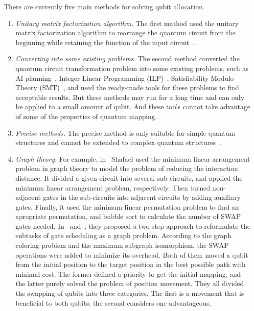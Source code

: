 \documentclass[runningheads]{llncs}
\begin{document}
There are currently five main methods for solving qubit allocation.
\begin{enumerate}
	\item \emph{Unitary matrix factorization algorithm.} 
	The first mathod used the unitary matrix factorization algorithm to rearrange 
the quantum circuit from the beginning while retaining the function of the input 
circuit~\cite{2019CNOT,2019Quantum}.
	\item \emph{Converting into some existing problems.}  
	The second method converted the quantum circuit transformation problem into 
	some existing problems, such as AI planning~\cite{2017Temporal,2018Integer}, 
	Integer Linear Programming (ILP)~\cite{2019Almeida}, 
	Satisfiability Modulo Theory (SMT)~\cite{2019Murali},
	and used the ready-made tools for these problems to find acceptable results.
	But these methods may run for a long time and 
	can only be applied to a small amount of qubit. 
	And these tools cannot take advantage of some of the properties of quantum mapping.
	\item \emph{Precise methods.} 
	The precise method is only suitable for simple quantum structures and cannot be extended to 
	complex quantum structures~\cite{2018QubitSiraichi}.
	\item \emph{Graph theory.} 
	For example, in~\cite{Shafaei2013} Shafaei used the minimum linear arrangement problem in graph theory 
   to model the problem of reducing the interaction distance.
   It divided a given circuit into several sub-circuits, 
   and applied the minimum linear arrangement problem, respectively.
   Then turned non-adjacent gates in the sub-circuits into adjacent circuits 
   by adding auxiliary gates.
   Finally, it used the minimum linear permutation problem to find an apropriate permutation, 
   and bubble sort to calculate the number of SWAP gates needed.
   In~\cite{Guerreschi2018} and~\cite{Matsuo2019}, they proposed
   a two-step approach to reformulate the subtasks 
   of gate scheduling as a graph problem.
   According to the graph coloring problem and the maximum subgraph isomorphism,
   the SWAP operations were added to minimize its overhead.
   Both of them moved a qubit from the initial position to 
   the target position in the best possible path with minimal cost.
   The former defined a priority to get the initial mapping, 
   and the latter purely solved the problem of position movement. 
   They all divided the swapping of qubits into three categories. 
   The first is a movement that is beneficial to both qubits; 
   the second considers one advantageous, 

\end{enumerate}
\end{document}
